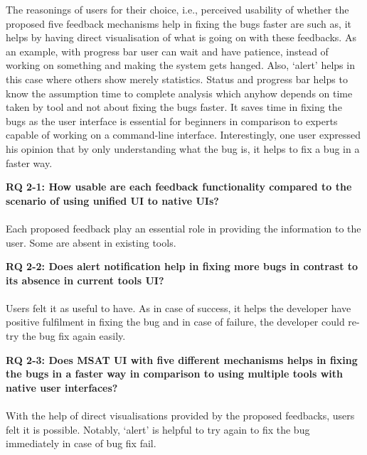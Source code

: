 The reasonings of users for their choice, i.e., perceived usability of whether the proposed five feedback mechanisms help in fixing the bugs faster are such as, it helps by having direct visualisation of what is going on with these feedbacks. As an example, with progress bar user can wait and have patience, instead of working on something and making the system gets hanged. Also, ‘alert’ helps in this case where others show merely statistics. Status and progress bar helps to know the assumption time to complete analysis which anyhow depends on time taken by tool and not about fixing the bugs faster. It saves time in fixing the bugs as the user interface is essential for beginners in comparison to experts capable of working on a command-line interface. Interestingly, one user expressed his opinion that by only understanding what the bug is, it helps to fix a bug in a faster way. \\

\begin{myboxi}{{\textbf{RQ 2-1: How usable are each feedback functionality compared to the scenario of using unified UI to native UIs?}}}
	\\ \\ Each proposed feedback play an essential role in providing the information to the user. Some are absent in existing tools. \\
\end{myboxi}
\clearpage
\begin{myboxi}{{\textbf{RQ 2-2: Does alert notification help in fixing more bugs in contrast to its absence in current tools UI?}}}
	\\ \\ Users felt it as useful to have. As in case of success, it helps the developer have positive fulfilment in fixing the bug and in case of failure, the developer could re-try the bug fix again easily. \\
\end{myboxi}

\begin{myboxi}{{\textbf{RQ 2-3: Does MSAT UI with five different mechanisms helps in fixing the bugs in a faster way in comparison to using multiple tools with native user interfaces?}}}
	\\ \\ With the help of direct visualisations provided by the proposed feedbacks, users felt it is possible. Notably, ‘alert’ is helpful to try again to fix the bug immediately in case of bug fix fail. \\
\end{myboxi}

